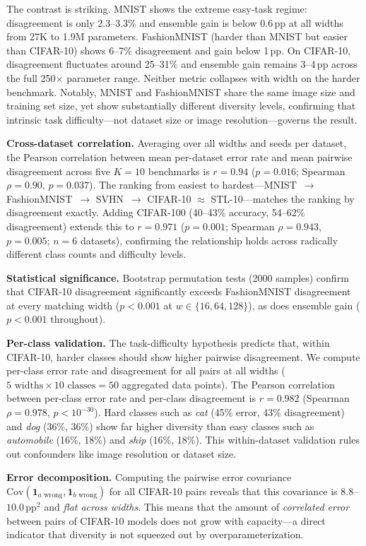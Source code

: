 \documentclass[11pt]{article}
\begin{document}
The contrast is striking.  MNIST shows the extreme easy-task regime:
disagreement is only 2.3--3.3\% and ensemble gain is below 0.6\,pp at
all widths from 27K to 1.9M parameters.  FashionMNIST (harder than MNIST
but easier than CIFAR-10) shows 6--7\% disagreement and gain below 1\,pp.
On CIFAR-10, disagreement fluctuates around 25--31\% and ensemble gain
remains 3--4\,pp across the full 250$\times$ parameter range.  Neither
metric collapses with width on the harder benchmark.  Notably, MNIST and
FashionMNIST share the same image size and training set size, yet show
substantially different diversity levels, confirming that intrinsic task
difficulty—not dataset size or image resolution—governs the result.

\textbf{Cross-dataset correlation.}  Averaging over all widths and
seeds per dataset, the Pearson correlation between mean per-dataset
error rate and mean pairwise disagreement across five $K=10$ benchmarks is
$r = 0.94$ ($p = 0.016$; Spearman $\rho = 0.90$, $p = 0.037$).  The ranking from
easiest to hardest---MNIST~$\to$ FashionMNIST~$\to$ SVHN~$\to$ CIFAR-10
$\approx$ STL-10---matches the ranking by disagreement exactly.  Adding
CIFAR-100 (40--43\% accuracy, 54--62\% disagreement) extends
this to $r = 0.971$ ($p = 0.001$; Spearman $\rho = 0.943$, $p = 0.005$; $n = 6$
datasets), confirming the relationship holds across radically different class
counts and difficulty levels.

\textbf{Statistical significance.}  Bootstrap permutation tests (2000
samples) confirm that CIFAR-10 disagreement significantly exceeds
FashionMNIST disagreement at every matching width ($p < 0.001$ at
$w \in \{16, 64, 128\}$), as does ensemble gain ($p < 0.001$ throughout).

\textbf{Per-class validation.}  The task-difficulty hypothesis predicts
that, within CIFAR-10, harder classes should show higher pairwise
disagreement.  We compute per-class error rate and disagreement for all
pairs at all widths ($5\text{ widths} \times 10\text{ classes} = 50$
aggregated data points).  The Pearson
correlation between per-class error rate and per-class disagreement is
$r = 0.982$ (Spearman $\rho = 0.978$, $p < 10^{-30}$).  Hard classes such
as \emph{cat} (45\% error, 43\% disagreement) and \emph{dog} (36\%,
36\%) show far higher diversity than easy classes such as
\emph{automobile} (16\%, 18\%) and \emph{ship} (16\%, 18\%).  This
within-dataset validation rules out confounders like image resolution or
dataset size.

\textbf{Error decomposition.}  Computing the pairwise error covariance
$\mathrm{Cov}(\mathbf{1}_{a\text{ wrong}}, \mathbf{1}_{b\text{ wrong}})$
for all CIFAR-10 pairs reveals that this covariance is $8.8$--$10.0$\,pp$^2$
and \emph{flat across widths}.  This means that the amount of
\emph{correlated error} between pairs of CIFAR-10 models does not grow with
capacity—a direct indicator that diversity is not squeezed out by
overparameterization.
\end{document}
